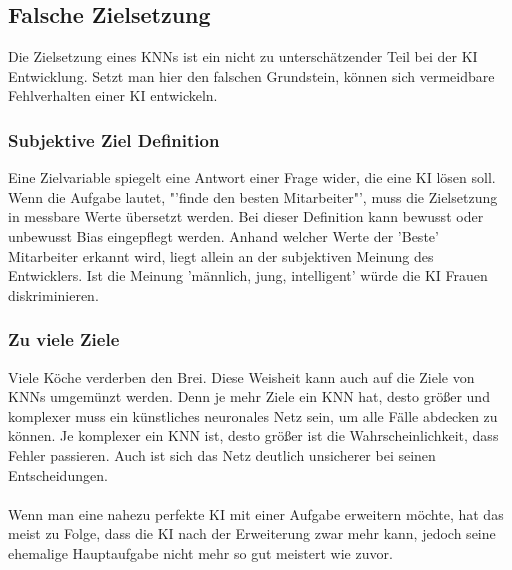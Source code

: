 \documentclass[12pt,oneside,a4paper,parskip]{scrbook}
\begin{document}
\subsection{Falsche Zielsetzung}
Die Zielsetzung eines KNNs ist ein nicht zu unterschätzender Teil bei der KI Entwicklung. Setzt man hier den falschen Grundstein, können sich vermeidbare Fehlverhalten einer KI entwickeln.
\subsubsection{Subjektive Ziel Definition}
Eine Zielvariable spiegelt eine Antwort einer Frage wider, die eine KI lösen soll. Wenn die Aufgabe lautet, "'finde den besten Mitarbeiter"', muss die Zielsetzung in messbare Werte übersetzt werden. Bei dieser Definition kann bewusst oder unbewusst Bias eingepflegt werden. Anhand welcher Werte der 'Beste' Mitarbeiter erkannt wird, liegt allein an der subjektiven Meinung des Entwicklers. Ist die Meinung 'männlich, jung, intelligent' würde die KI Frauen diskriminieren.
\subsubsection{Zu viele Ziele}
Viele Köche verderben den Brei. Diese Weisheit kann auch auf die Ziele von KNNs umgemünzt werden. Denn je mehr Ziele ein KNN hat, desto größer und komplexer muss ein künstliches neuronales Netz sein, um alle Fälle abdecken zu können. Je komplexer ein KNN ist, desto größer ist die Wahrscheinlichkeit, dass Fehler passieren. Auch ist sich das Netz deutlich unsicherer bei seinen Entscheidungen.
\\\\ %
Wenn man eine nahezu perfekte KI mit einer Aufgabe erweitern möchte, hat das meist zu Folge, dass die KI nach der Erweiterung zwar mehr kann, jedoch seine ehemalige Hauptaufgabe nicht mehr so gut meistert wie zuvor.
\end{document}
